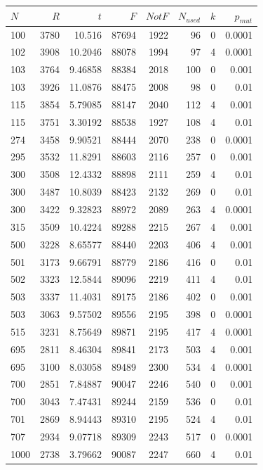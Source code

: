 \begin{table}
\centering\footnotesize\sf
\begin{tabular}{lrrrrrrr}
\toprule
$N$ & $R$ & $t$ & $F$ & $Not F$ & $N_{used}$ & $k$ & $p_{mut}$\\
\midrule
100 & 3780 & 10.516 & 87694 & 1922 & 96 & 0 & 0.0001 \\
102 & 3908 & 10.2046 & 88078 & 1994 & 97 & 4 & 0.0001 \\
103 & 3764 & 9.46858 & 88384 & 2018 & 100 & 0 & 0.001 \\
103 & 3926 & 11.0876 & 88475 & 2008 & 98 & 0 & 0.01 \\
115 & 3854 & 5.79085 & 88147 & 2040 & 112 & 4 & 0.001 \\
115 & 3751 & 3.30192 & 88538 & 1927 & 108 & 4 & 0.01 \\
274 & 3458 & 9.90521 & 88444 & 2070 & 238 & 0 & 0.0001 \\
295 & 3532 & 11.8291 & 88603 & 2116 & 257 & 0 & 0.001 \\
300 & 3508 & 12.4332 & 88898 & 2111 & 259 & 4 & 0.01 \\
300 & 3487 & 10.8039 & 88423 & 2132 & 269 & 0 & 0.01 \\
300 & 3422 & 9.32823 & 88972 & 2089 & 263 & 4 & 0.0001 \\
315 & 3509 & 10.4224 & 89288 & 2215 & 267 & 4 & 0.001 \\
500 & 3228 & 8.65577 & 88440 & 2203 & 406 & 4 & 0.001 \\
501 & 3173 & 9.66791 & 88779 & 2186 & 416 & 0 & 0.01 \\
502 & 3323 & 12.5844 & 89096 & 2219 & 411 & 4 & 0.01 \\
503 & 3337 & 11.4031 & 89175 & 2186 & 402 & 0 & 0.001 \\
503 & 3063 & 9.57502 & 89556 & 2195 & 398 & 0 & 0.0001 \\
515 & 3231 & 8.75649 & 89871 & 2195 & 417 & 4 & 0.0001 \\
695 & 2811 & 8.46304 & 89841 & 2173 & 503 & 4 & 0.001 \\
695 & 3100 & 8.03058 & 89489 & 2300 & 534 & 4 & 0.0001 \\
700 & 2851 & 7.84887 & 90047 & 2246 & 540 & 0 & 0.001 \\
700 & 3043 & 7.47431 & 89244 & 2159 & 536 & 0 & 0.01 \\
701 & 2869 & 8.94443 & 89310 & 2195 & 524 & 4 & 0.01 \\
707 & 2934 & 9.07718 & 89309 & 2243 & 517 & 0 & 0.0001 \\
1000 & 2738 & 3.79662 & 90087 & 2247 & 660 & 4 & 0.01 \\

\end{tabular}
\end{table}
